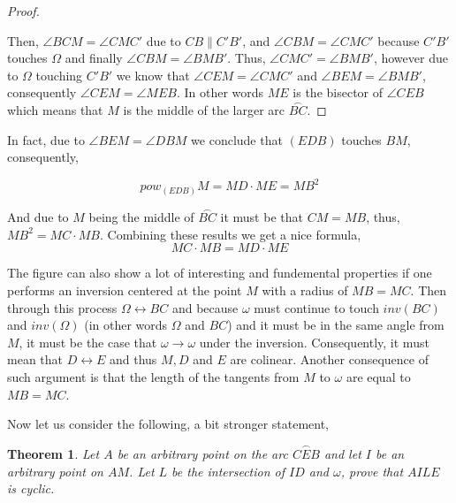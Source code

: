 \documentclass{article}
\newtheorem{theorem}{Theorem}
\newcommand{\tarc}{\frown}
\newcommand{\arc}[1]{\stackrel{\tarc}{#1}}
\begin{document}
\begin{proof}
\begin{center}
 \end{center}
 
 Then, \(\angle{BCM} = \angle{CMC'}\) due to \(CB \parallel C'B'\), and \(\angle{CBM} = \angle{CMC'}\) because \(C'B'\) touches \(\Omega\) and finally \(\angle{CBM} = \angle{BMB'}\). Thus, \(\angle{CMC'} = \angle{BMB'}\), however due to \(\Omega\) touching \(C'B'\) we know that \(\angle{CEM} = \angle{CMC'}\) and \(\angle{BEM} = \angle{BMB'}\), consequently \(\angle{CEM} = \angle{MEB}\). In other words \(ME\) is the bisector of \(\angle{CEB}\) which means that \(M\) is the middle of the larger arc \(\arc{BC}\).
 
 \end{proof}
    
In fact, due to \(\angle{BEM} = \angle{DBM}\) we conclude that \((EDB)\) touches \(BM\), consequently,

\begin{equation}
    pow_{(EDB)} M = MD \cdot ME = MB^2
\end{equation}
    
And due to \(M\) being the middle of \(\arc{BC}\) it must be that \(CM = MB\), thus, \(MB^2 = MC \cdot MB\). Combining these results we get a nice formula,
\begin{equation}
    MC \cdot MB = MD \cdot ME
\end{equation}

The figure can also show a lot of interesting and fundemental properties if one performs an inversion centered at the point \(M\) with a radius of \(MB = MC\). Then through this process \(\Omega \leftrightarrow BC\) and because \(\omega\) must continue to touch \(inv(BC)\) and \(inv(\Omega)\) (in other words \(\Omega\) and \(BC\)) and it must be in the same angle from \(M\), it must be the case that \(\omega \rightarrow \omega\) under the inversion. Consequently, it must mean that \(D \leftrightarrow E\) and thus \(M, D\) and \(E\) are colinear. Another consequence of such argument is that the length of the tangents from \(M\) to \(\omega\) are equal to \(MB = MC\).

Now let us consider the following, a bit stronger statement,

\begin{theorem}
Let \(A\) be an arbitrary point on the arc \(\arc{CEB}\) and let \(I\) be an arbitrary point on \(AM\). Let \(L\) be the intersection of \(ID\) and \(\omega\), prove that \(AILE\) is cyclic.
\end{theorem}
\end{document}
